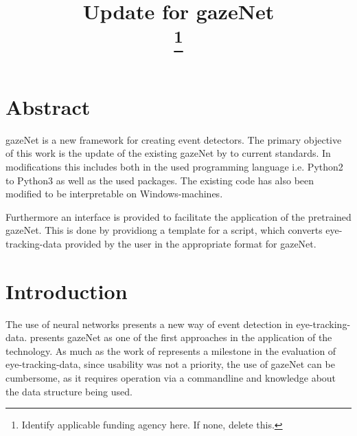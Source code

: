 \documentclass[conference]{IEEEtran}
\begin{document}
\title{Update for gazeNet\\
\thanks{Identify applicable funding agency here. If none, delete this.}
}

\author{
\and
{}
\and
{}
}

\maketitle
\section{Abstract}
gazeNet is a new framework for creating event detectors. The primary objective of this work is the update of the existing gazeNet by \citet{zemblys2018gazeNet} to current standards. In modifications this includes both in the used programming language i.e. Python2 to Python3 as well as the used packages. The existing code has also been modified to be interpretable on Windows-machines.

Furthermore an interface is provided to facilitate the application of the pretrained gazeNet. This is done by providiong a template for a script, which converts eye-tracking-data provided by the user in the appropriate format for gazeNet.


\section{Introduction}
The use of neural networks presents a new way of event detection in eye-tracking-data. \citet{zemblys2018gazeNet} presents gazeNet as one of the first approaches in the application of the technology. As much as the work of \citet*{zemblys2018gazeNet} represents a milestone in the evaluation of eye-tracking-data, since usability was not a priority, the use of gazeNet can be cumbersome, as it requires operation via a commandline and knowledge about the data structure being used.
\end{document}
